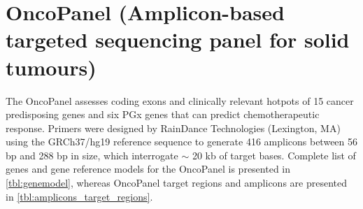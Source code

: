 \section{OncoPanel (Amplicon-based targeted sequencing panel for solid tumours)}
\label{sec:OncoPanel}

The OncoPanel assesses coding exons and clinically relevant hotpots of 15 cancer predisposing genes and six PGx genes that can predict chemotherapeutic response. Primers were designed by RainDance Technologies (Lexington, MA) using the GRCh37/hg19 reference sequence to generate 416 amplicons between 56 bp and 288 bp in size, which interrogate $\sim$ 20 kb of target bases. Complete list of genes and gene reference models for the OncoPanel is presented in \autoref{tbl:genemodel}, whereas OncoPanel target regions and amplicons are presented in \autoref{tbl:amplicons_target_regions}.

